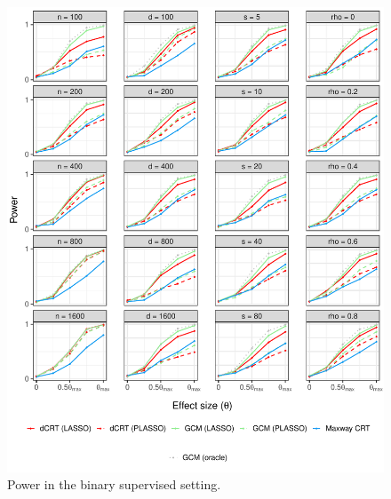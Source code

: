 \documentclass[aos]{imsart}
\theoremstyle{plain}
\theoremstyle{remark}
\begin{document}
\begin{figure}[!ht]
	\centering
	\includegraphics[width = \textwidth]{figures/binomial_supervised_setting_alternative.pdf}
	\caption{Power in the binary supervised setting.}
	\label{fig:binomial_supervised_alternative}
\end{figure}
\end{document}
